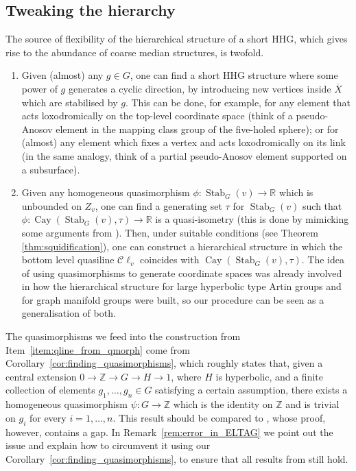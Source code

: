 \documentclass[svgnames]{amsart}
\theoremstyle{plain}
\theoremstyle{definition}
\newcommand{\Z}{\mathbb{Z}}
\newcommand{\R}{\mathbb{R}}
\newcommand{\Cay}[2]{\operatorname{Cay}\left(#1,#2\right)}
\newcommand{\C}{\mathcal C}
\newcommand{\ov}[1]{\overline{#1}}
\newcommand{\Stab}[2]{\operatorname{Stab}_{#1}(#2)}
\begin{document}
\subsection*{Tweaking the hierarchy}
The source of flexibility of the hierarchical structure of a short HHG, which gives rise to the abundance of coarse median structures, is twofold.
\begin{enumerate}
\item Given (almost) any $g\in G$, one can find a short HHG structure where some power of $g$ generates a cyclic direction, by introducing new vertices inside $\ov X$ which are stabilised by $g$. This can be done, for example, for any element that acts loxodromically on the top-level coordinate space (think of a pseudo-Anosov element in the mapping class group of the five-holed sphere); or for (almost) any element which fixes a vertex and acts loxodromically on its link (in the same analogy, think of a partial pseudo-Anosov element supported on a subsurface).
\item\label{item:qline_from_qmorph} Given any homogeneous quasimorphism $\phi\colon\Stab{G}{v}\to\R$ which is unbounded on $Z_v$, one can find a generating set $\tau$ for $\Stab{G}{v}$ such that $\phi\colon\Cay{\Stab{G}{v}}{\tau}\to\R$ is a quasi-isometry (this is done by mimicking some arguments from \cite{ABO}). Then, under suitable conditions (see Theorem \ref{thm:squidification}), one can construct a hierarchical structure in which the bottom level quasiline $\C\ell_v$ coincides with $\Cay{\Stab{G}{v}}{\tau}$. The idea of using quasimorphisms to generate coordinate spaces was already involved in how the hierarchical structure for large hyperbolic type Artin groups \cite{ELTAG_HHS} and for graph manifold groups \cite{HRSS_3manifold} were built, so our procedure can be seen as a generalisation of both. 
\end{enumerate}

The quasimorphisms we feed into the construction from Item~\eqref{item:qline_from_qmorph} come from Corollary~\ref{cor:finding_quasimorphisms}, which roughly states that, given a central extension $0\to \Z\to G\to H\to 1$, where $H$ is hyperbolic, and a finite collection of elements $g_1,\ldots, g_n\in G$ satisfying a certain assumption, there exists a homogeneous quasimorphism $\psi\colon G\to \Z$ which is the identity on $\Z$ and is trivial on $g_i$ for every ${i=1,\ldots, n}$. This result should be compared to \cite[Lemma 4.4]{ELTAG_HHS}, whose proof, however, contains a gap. In Remark~\ref{rem:error_in_ELTAG} we point out the issue and explain how to circumvent it using our Corollary~\ref{cor:finding_quasimorphisms}, to ensure that all results from \cite{ELTAG_HHS} still hold.
\end{document}
